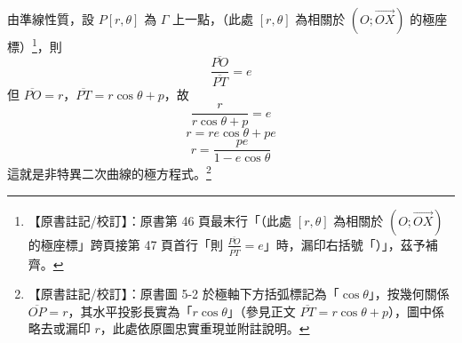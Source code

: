 由準線性質，設 $P[r, \theta]$ 為 $\Gamma$ 上一點，（此處 $[r, \theta]$ 為相關於 $(O; \vec{OX})$ 的極座標）\label{note:b5s-ch1-p46-paren}\footnote{【原書註記/校訂】：原書第 46 頁最末行「（此處 $[r, \theta]$ 為相關於 $(O; \vec{OX})$ 的極座標」跨頁接第 47 頁首行「則 $\frac{\overline{PO}}{\overline{PT}} = e$」時，漏印右括號「）」，茲予補齊。}，則
\[
  \frac{\overline{PO}}{\overline{PT}} = e
\]
但 $\overline{PO} = r$，$\overline{PT} = r\cos\theta + p$，故
\[
  \frac{r}{r\cos\theta + p} = e
\]
\[
  r = re\cos\theta + pe
\]
\begin{equation}
  r = \frac{pe}{1 - e\cos\theta} \tag{1} \label{eq:b5s-1-5-1}
\end{equation}
這就是非特異二次曲線的極方程式。\label{note:b5s-ch1-p47-fig52}\footnote{【原書註記/校訂】：原書圖 5-2 於極軸下方括弧標記為「$\cos\theta$」，按幾何關係 $\overline{OP}=r$，其水平投影長實為「$r\cos\theta$」（參見正文 $\overline{PT}=r\cos\theta+p$），圖中係略去或漏印 $r$，此處依原圖忠實重現並附註說明。}

